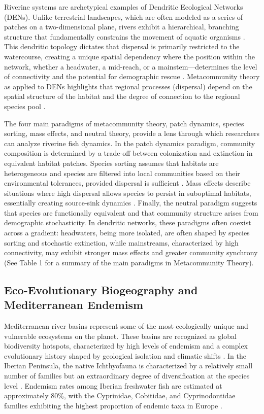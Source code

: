 \documentclass[11pt,a4paper]{article}
\begin{document}
Riverine systems are archetypical examples of Dendritic Ecological Networks (DENs). Unlike terrestrial landscapes, which are often modeled as a series of patches on a two-dimensional plane, rivers exhibit a hierarchical, branching structure that fundamentally constrains the movement of aquatic organisms \cite{Pelletieretal2009}. This dendritic topology dictates that dispersal is primarily restricted to the watercourse, creating a unique spatial dependency where the position within the network, whether a headwater, a mid-reach, or a mainstem—determines the level of connectivity and the potential for demographic rescue \cite{Pelletieretal2009}. Metacommunity theory as applied to DENs highlights that regional processes (dispersal) depend on the spatial structure of the habitat and the degree of connection to the regional species pool \cite{Larsenetal2021}.

The four main paradigms of metacommunity theory, patch dynamics, species sorting, mass effects, and neutral theory, provide a lens through which researchers can analyze riverine fish dynamics. In the patch dynamics paradigm, community composition is determined by a trade-off between colonization and extinction in equivalent habitat patches. Species sorting assumes that habitats are heterogeneous and species are filtered into local communities based on their environmental tolerances, provided dispersal is sufficient \cite{PerkinGido2012}. Mass effects describe situations where high dispersal allows species to persist in suboptimal habitats, essentially creating source-sink dynamics \cite{Larsenetal2021}. Finally, the neutral paradigm suggests that species are functionally equivalent and that community structure arises from demographic stochasticity. In dendritic networks, these paradigms often coexist across a gradient: headwaters, being more isolated, are often shaped by species sorting and stochastic extinction, while mainstreams, characterized by high connectivity, may exhibit stronger mass effects and greater community synchrony \cite{Pelletieretal2009} (See Table 1 for a summary of the main paradigms in Metacommunity Theory).

\subsection{Eco-Evolutionary Biogeography and Mediterranean Endemism}
Mediterranean river basins represent some of the most ecologically unique and vulnerable ecosystems on the planet. These basins are recognized as global biodiversity hotspots, characterized by high levels of endemism and a complex evolutionary history shaped by geological isolation and climatic shifts \cite{Herrera2022}. In the Iberian Peninsula, the native Ichthyofauna is characterized by a relatively small number of families but an extraordinary degree of diversification at the species level \cite{Herrera2022}. Endemism rates among Iberian freshwater fish are estimated at approximately 80\%, with the Cyprinidae, Cobitidae, and Cyprinodontidae families exhibiting the highest proportion of endemic taxa in Europe \cite{DeMiguel2014}.
\end{document}
